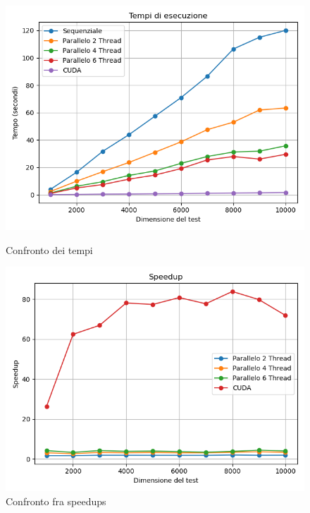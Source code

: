\documentclass[11pt]{article}
\begin{document}
    \begin{figure}[H]
        \centering
        \begin{minipage}{0.49\textwidth}
            \centering
            \includegraphics[width=\textwidth]{plots/512/results_times}
            \caption{Confronto dei tempi}\label{fig:tempi-512}
        \end{minipage}
        \begin{minipage}{0.49\textwidth}
            \centering
            \includegraphics[width=\textwidth]{plots/512/results_speedup}
            \caption{Confronto fra speedups}\label{fig:speedups-512}
        \end{minipage}
    \end{figure}
\end{document}
